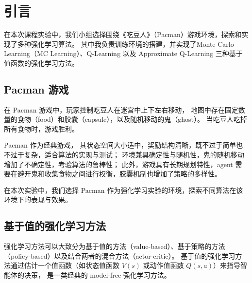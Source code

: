 \section{引言}

在本次课程实验中，我们小组选择围绕《吃豆人》（Pacman）游戏环境，探索和实现了多种强化学习算法。
其中我负责训练环境的搭建，并实现了Monte Carlo Learning（MC Learning）、Q-Learning 以及 Approximate Q-Learning 三种基于值函数的强化学习方法。

\subsection{Pacman 游戏}
在 Pacman 游戏中，玩家控制吃豆人在迷宫中上下左右移动，
地图中存在固定数量的食物（food）和胶囊（capsule），以及随机移动的鬼（ghost）。
当吃豆人吃掉所有食物时，游戏胜利。



 Pacman 作为经典游戏，%
其状态空间大小适中，奖励结构清晰，既不过于简单也不过于复杂，适合算法的实现与测试；
环境兼具确定性与随机性，鬼的随机移动增加了不确定性，考验算法的鲁棒性；
此外，游戏具有长期规划特性，agent 需要在避开鬼和收集食物之间进行权衡，胶囊机制也增加了策略的多样性。

在本次实验中，我们选择 Pacman 作为强化学习实验的环境，探索不同算法在该环境下的表现与效果。


\subsection{基于值的强化学习方法}

强化学习方法可以大致分为基于值的方法（value-based）、基于策略的方法（policy-based）以及结合两者的混合方法（actor-critic）。
基于值的强化学习方法通过估计一个值函数（如状态值函数 $V(s)$ 或动作值函数 $Q(s,a)$）来指导智能体的决策，
是一类经典的 model-free 强化学习方法。

